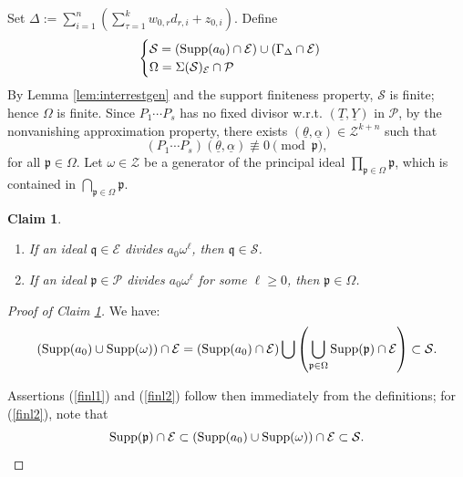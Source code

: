 \documentclass[11pt,a4paper,reqno]{amsart}
\newtheorem{claim}{Claim}
\theoremstyle{definition}
\begin{document}
Set $\Delta:=\sum_{i=1}^n\left(\sum_{\tau=1}^k w_{0,r} d_{r,i}+z_{0,i}\right)$. Define
$$
\begin{cases}
\mathcal{S}=({\rm Supp}(a_0) \cap \mathcal{E}) \cup (\Gamma_\Delta \cap \mathcal{E})\\
\Omega=\Sigma(\mathcal{S})_{\mathcal{E}} \cap \mathcal{P}
\end{cases}
$$
By Lemma \ref{lem:interrestgen} and the support finiteness property, $\mathcal{S}$ is finite; hence $\Omega$ is finite. Since $P_1\cdots P_s$ has no fixed divisor \hbox{w.r.t.} $(\underline{T},\underline{Y})$ in $\mathcal{P}$, by the nonvanishing approximation property, there exists $(\underline{\theta},\underline{\alpha}) \in \mathcal{Z}^{k+n}$ such that 
\begin{equation}\label{eq:nonvaneee}
(P_1\cdots P_s)(\underline{\theta},\underline{\alpha}) \not \equiv 0 \pmod{\mathfrak{p}},
\end{equation} for all $\mathfrak{p} \in \Omega$. Let $\omega \in \mathcal{Z}$ be a generator of the principal ideal $\prod_{\mathfrak{p} \in \Omega} \mathfrak{p}$, which is contained in $\bigcap_{\mathfrak{p} \in \Omega} \mathfrak{p}$.
\begin{claim}\label{claim:invardiv}
\begin{enumerate}
\item If an ideal $\mathfrak{q} \in \mathcal{E}$ divides $a_0  \omega^\ell$,  then $\mathfrak{q} \in \mathcal{S}$.\label{finl1}
\item If an ideal $\mathfrak{p} \in \mathcal{P}$ divides $a_0 \omega^\ell$ for some $\ell \geq 0$, then $\mathfrak{p} \in \Omega$.\label{finl2}
\end{enumerate}
\end{claim}
\begin{proof}[Proof of Claim \ref{claim:invardiv}]
 
We have: 
$$
 ({\rm Supp}(a_0) \cup {\rm Supp}(\omega)) \cap \mathcal{E}
=({\rm Supp}(a_0) \cap \mathcal{E}) \bigcup \left(\bigcup_{\mathfrak{p} \in \Omega} {\rm Supp}(\mathfrak{p}) \cap \mathcal{E}\right)\subset \mathcal{S}.
$$ 

\noindent
Assertions (\ref{finl1}) and (\ref{finl2}) follow then immediately from the definitions; for (\ref{finl2}), note that 
$$
{\rm Supp}(\mathfrak{p}) \cap \mathcal{E} \subset ({\rm Supp}(a_0) \cup {\rm Supp}(\omega)) \cap \mathcal{E} \subset \mathcal{S}.
$$
\end{proof}
\end{document}
